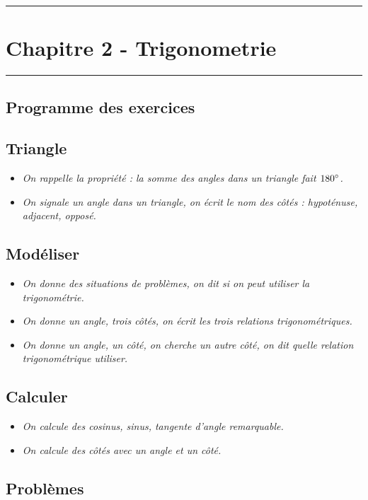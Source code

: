 \documentclass[12pt]{article}
\newcommand{\horrule}[1]{\rule{\linewidth}{#1}} %
\begin{document}

\newtheorem{Definition}{Définition}
\newtheorem{Theorem}{Théorème}
\newtheorem{Proposition}{Propriété}

\renewcommand{\labelitemi}{$\bullet$}
\renewcommand{\labelitemii}{$\circ$}

\setlength{\columnseprule}{1pt}

\horrule{2px}
\section*{Chapitre 2 - Trigonometrie}
\horrule{2px}

\subsection*{Programme des exercices}


\subsection*{Triangle}

\begin{itemize}
	\item \textit{On rappelle la propriété : la somme des angles dans un triangle fait $180 \degree$.}
	\item \textit{On signale un angle dans un triangle, on écrit le nom des côtés : hypoténuse, adjacent, opposé.}
\end{itemize}

\subsection*{Modéliser}

\begin{itemize}
	\item \textit{On donne des situations de problèmes, on dit si on peut utiliser la trigonométrie.}
	\item \textit{On donne un angle, trois côtés, on écrit les trois relations trigonométriques.}
	\item \textit{On donne un angle, un côté, on cherche un autre côté, on dit quelle relation trigonométrique utiliser.}
\end{itemize}


\subsection*{Calculer}

\begin{itemize}
	\item \textit{On calcule des cosinus, sinus, tangente d'angle remarquable.}
	\item \textit{On calcule des côtés avec un angle et un côté.}
\end{itemize}

\subsection*{Problèmes}
\end{document}

